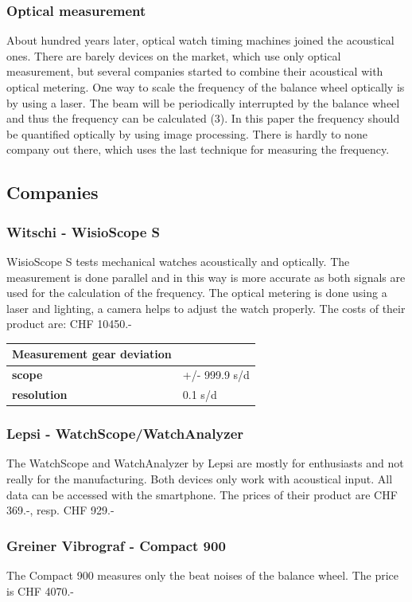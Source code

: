 \documentclass[12pt, a4paper]{report}
\begin{document}
\subsubsection{Optical measurement}
About hundred years later, optical watch timing machines joined the acoustical ones. There are barely devices on the market, which use only optical measurement, but several companies started to combine their acoustical with optical metering. One way to scale the frequency of the balance wheel optically is by using a laser. The beam will be periodically interrupted by the balance wheel and thus the frequency can be calculated (3). In this paper the frequency should be quantified optically by using image processing. There is hardly to none company out there, which uses the last technique for measuring the frequency.

\subsection{Companies}
\subsubsection{Witschi - WisioScope S}
WisioScope S tests mechanical watches acoustically and optically. The measurement is done parallel and in this way is more accurate as both signals are used for the calculation of the frequency.
The optical metering is done using a laser and lighting, a camera helps to adjust the watch properly. The costs of their product are: CHF 10450.-

\bigskip

\begin{tabularx}{\textwidth}{>{\bfseries}lX}
Measurement gear deviation & \\\toprule
scope & +/- 999.9 s/d \\\midrule
resolution & 0.1 s/d\\\bottomrule
\end{tabularx}

\subsubsection{Lepsi - WatchScope/WatchAnalyzer}
The WatchScope and WatchAnalyzer by Lepsi are mostly for enthusiasts and not really for the manufacturing. Both devices only work with acoustical input. All data can be accessed with the smartphone. The prices of their product are CHF 369.-, resp. CHF 929.-

\subsubsection{Greiner Vibrograf - Compact 900}
The Compact 900 measures only the beat noises of the balance wheel. The price is CHF 4070.-
\end{document}
